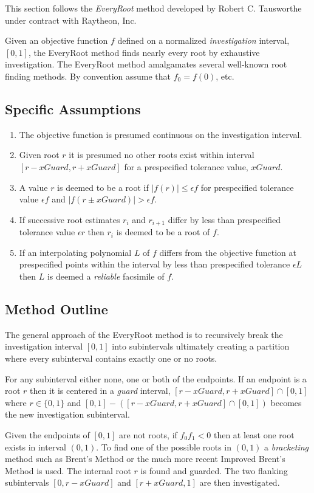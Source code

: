 This section follows the \emph{EveryRoot} method developed by Robert C. Tausworthe \cite{tausworthe09} under contract with Raytheon, Inc.

Given an objective function $f$ defined on a normalized \emph{investigation} interval, $[0,1]$, the EveryRoot method finds nearly every root by exhaustive investigation. The EveryRoot method amalgamates several well-known root finding methods. By convention assume that $f_0 = f(0)$, etc.

\subsection{Specific Assumptions}
\begin{enumerate}
\item The objective function is presumed continuous on the investigation interval.
\item Given root $r$ it is presumed no other roots exist within interval $[r-xGuard, r+xGuard]$ for a prespecified tolerance value, $xGuard$.
\item A value $r$ is deemed to be a root if $|f(r)| \le \epsilon f$ for prespecified tolerance value $\epsilon f$ and $|f(r \pm xGuard)| > \epsilon f$.
\item If successive root estimates $r_i$ and $r_{i+1}$ differ by less than prespecified tolerance value $\epsilon r$ then $r_i$ is deemed to be a root of $f$.
\item If an interpolating polynomial $L$ of $f$ differs from the objective function at prespecified points within the interval by less than prespecified tolerance $\epsilon L$ then $L$ is deemed a \emph{reliable} facsimile of $f$.
\end{enumerate}

\subsection{Method Outline}
The general approach of the EveryRoot method is to recursively break the investigation interval $[0,1]$ into subintervals ultimately creating a partition where every subinterval contains exactly one or no roots. 

For any subinterval either none, one or both of the endpoints. If an endpoint is a root $r$ then it is centered in a \emph{guard} interval, $[r - xGuard, r+xGuard] \cap [0,1]$ where $r \in \{0,1\}$ and $[0,1]-([r - xGuard, r+xGuard] \cap [0,1])$ becomes the new investigation subinterval. 

Given the endpoints of $[0,1]$ are not roots, if $f_0f_1 < 0$ then at least one root exists in interval $(0,1)$. To find one of the possible roots in $(0,1)$ a \emph{bracketing} method such as Brent's Method \cite{brent73} or the much more recent Improved Brent's Method \cite{zhang11} is used. The internal root $r$ is found and guarded. The two flanking subintervals $[0,r-xGuard]$ and $[r+xGuard,1]$ are then investigated.

